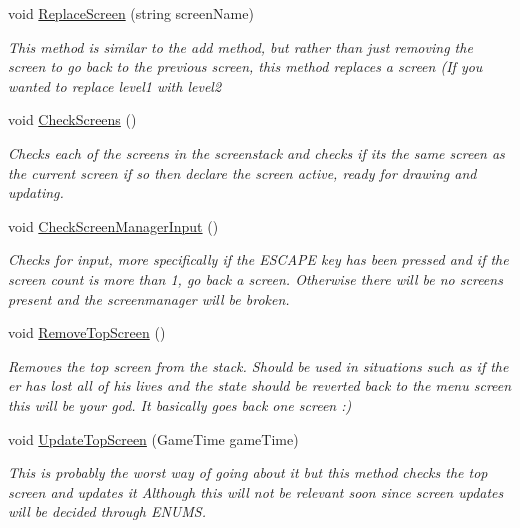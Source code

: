 \begin{DoxyCompactItemize}
void \hyperlink{a00538_a28af5b838f4345834dc2351e06c3d654}{Replace\+Screen} (string screen\+Name)
\begin{DoxyCompactList}\small\item\em This method is similar to the add method, but rather than just removing the screen to go back to the previous screen, this method replaces a screen (If you wanted to replace level1 with level2 \end{DoxyCompactList}\item 
void \hyperlink{a00538_abe1bf121b368a6d205706da54d949ace}{Check\+Screens} ()
\begin{DoxyCompactList}\small\item\em Checks each of the screens in the screenstack and checks if its the same screen as the current screen if so then declare the screen active, ready for drawing and updating. \end{DoxyCompactList}\item 
void \hyperlink{a00538_aa8e3ecdc7ae78094b07af944c31f90a9}{Check\+Screen\+Manager\+Input} ()
\begin{DoxyCompactList}\small\item\em Checks for input, more specifically if the E\+S\+C\+A\+PE key has been pressed and if the screen count is more than 1, go back a screen. Otherwise there will be no screens present and the screenmanager will be broken. \end{DoxyCompactList}\item 
void \hyperlink{a00538_ab553bead481adc65547a323af9dab2d5}{Remove\+Top\+Screen} ()
\begin{DoxyCompactList}\small\item\em Removes the top screen from the stack. Should be used in situations such as if the er has lost all of his lives and the state should be reverted back to the menu screen this will be your god. It basically goes back one screen \+:) \end{DoxyCompactList}\item 
void \hyperlink{a00538_a59b04e135a3b2a75a608752e2bfabc77}{Update\+Top\+Screen} (Game\+Time game\+Time)
\begin{DoxyCompactList}\small\item\em This is probably the worst way of going about it but this method checks the top screen and updates it Although this will not be relevant soon since screen updates will be decided through E\+N\+U\+MS. \end{DoxyCompactList}\end{DoxyCompactItemize}
